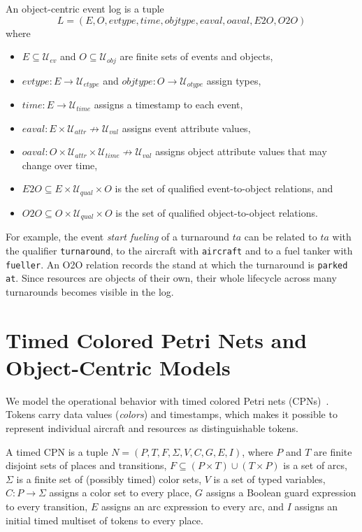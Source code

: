 \begin{definition}
\label{def:ocel}
An object-centric event log is a tuple
\[
L=(E,O,\mathit{evtype},\mathit{time},\mathit{objtype},\mathit{eaval},\mathit{oaval},E2O,O2O)
\]
where
\begin{itemize}
\item $E\subseteq\mathcal{U}_{ev}$ and $O\subseteq\mathcal{U}_{obj}$ are finite sets of events and objects,
\item $\mathit{evtype}:E\to\mathcal{U}_{etype}$ and $\mathit{objtype}:O\to\mathcal{U}_{otype}$ assign types,
\item $\mathit{time}:E\to\mathcal{U}_{time}$ assigns a timestamp to each event,
\item $\mathit{eaval}:E\times\mathcal{U}_{attr}\not\to\mathcal{U}_{val}$ assigns event attribute values,
\item $\mathit{oaval}:O\times\mathcal{U}_{attr}\times\mathcal{U}_{time}\not\to\mathcal{U}_{val}$ assigns object attribute values that may change over time,
\item $E2O\subseteq E\times\mathcal{U}_{qual}\times O$ is the set of qualified event-to-object relations, and
\item $O2O\subseteq O\times\mathcal{U}_{qual}\times O$ is the set of qualified object-to-object relations.
\end{itemize}
\end{definition}

For example, the event \emph{start fueling} of a turnaround $ta$ can be related to $ta$ with the qualifier \texttt{turnaround}, to the aircraft with \texttt{aircraft} and to a fuel tanker with \texttt{fueller}. An O2O relation records the stand at which the turnaround is \texttt{parked at}. Since resources are objects of their own, their whole lifecycle across many turnarounds becomes visible in the log.

\section{Timed Colored Petri Nets and Object-Centric Models}
\label{sec:prelim-cpn}

We model the operational behavior with timed colored Petri nets (CPNs)~\cite{jensen2009cpn}. Tokens carry data values (\emph{colors}) and timestamps, which makes it possible to represent individual aircraft and resources as distinguishable tokens.

\begin{definition}
\label{def:cpn}
A timed CPN is a tuple $N=(P,T,F,\Sigma,V,C,G,E,I)$, where $P$ and $T$ are finite disjoint sets of places and transitions, $F\subseteq(P\times T)\cup(T\times P)$ is a set of arcs, $\Sigma$ is a finite set of (possibly timed) color sets, $V$ is a set of typed variables, $C:P\to\Sigma$ assigns a color set to every place, $G$ assigns a Boolean guard expression to every transition, $E$ assigns an arc expression to every arc, and $I$ assigns an initial timed multiset of tokens to every place.
\end{definition}

